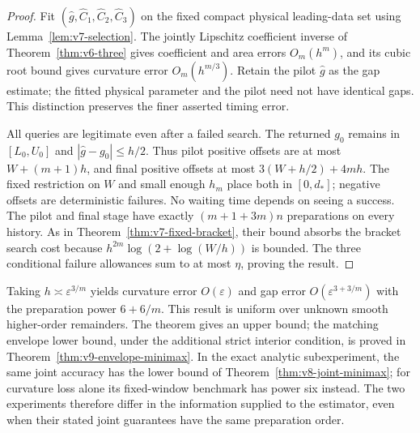 \begin{proof}
Fit $(\widehat g,\widehat C_1,\widehat C_2,\widehat C_3)$ on the
fixed compact physical leading-data set using
Lemma~\ref{lem:v7-selection}. The jointly Lipschitz coefficient inverse
of Theorem~\ref{thm:v6-three} gives coefficient and area errors
$O_m(h^m)$, and its cubic root bound gives curvature error $O_m(h^{m/3})$.
Retain the pilot $\widehat g$ as the gap estimate; the fitted physical
parameter and the pilot need not have identical gaps. This distinction
preserves the finer asserted timing error.

All queries are legitimate even after a failed search. The returned
$g_0$ remains in $[L_0,U_0]$ and
$|\widehat g-g_0|\le h/2$. Thus pilot positive offsets are at most
$W+(m+1)h$, and final positive offsets at most
$3(W+h/2)+4mh$. The fixed restriction on $W$ and small enough $h_m$
place both in $[0,d_*]$; negative offsets are deterministic failures.
No waiting time depends on seeing a success. The pilot and final stage
have exactly $(m+1+3m)n$ preparations on every history. As in
Theorem~\ref{thm:v7-fixed-bracket}, their bound absorbs the bracket
search cost because $h^{2m}\log(2+\log(W/h))$ is bounded. The three
conditional failure allowances sum to at most $\eta$, proving the
result.
\end{proof}

Taking $h\asymp\varepsilon^{3/m}$ yields curvature error
$O(\varepsilon)$ and gap error $O(\varepsilon^{3+3/m})$ with the
preparation power $6+6/m$. This result is uniform over unknown smooth
higher-order remainders. The theorem gives an upper bound; the matching envelope lower bound,
under the additional strict interior condition, is proved in
Theorem~\ref{thm:v9-envelope-minimax}. In the exact analytic
subexperiment, the same joint accuracy has the lower bound of
Theorem~\ref{thm:v8-joint-minimax}; for curvature loss alone its
fixed-window benchmark has power six instead. The two experiments
therefore differ in the information supplied to the estimator, even
when their stated joint guarantees have the same preparation order.
